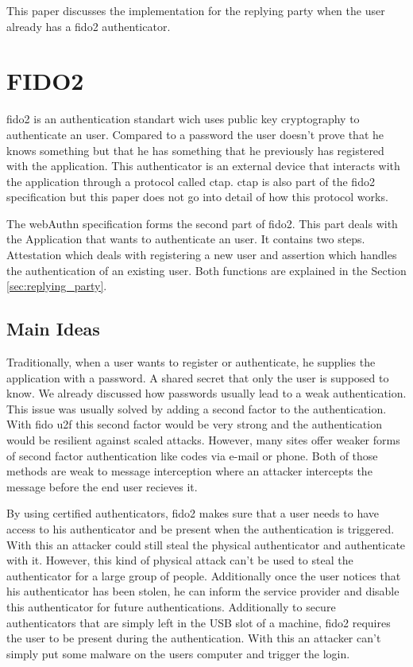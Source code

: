\documentclass[a4paper, 11pt]{scrartcl}
\begin{document}
This paper discusses the implementation for the replying party when the user already has a \gls{fido2} authenticator.

\section{FIDO2}

\gls{fido2} is an authentication standart wich uses public key cryptography to authenticate an user. Compared to a password the user doesn't prove that he knows something but that he has something that he previously has registered with the application. This authenticator is an external device that interacts with the application through a protocol called \gls{ctap}. \gls{ctap} is also part of the \gls{fido2} specification but this paper does not go into detail of how this protocol works. \cite{ctap}

The \gls{webAuthn} specification forms the second part of \gls{fido2}. This part deals with the Application that wants to authenticate an user. It contains two steps. Attestation which deals with registering a new user and assertion which handles the authentication of an existing user. Both functions are explained in the Section \ref{sec:replying_party}.

\subsection{Main Ideas}

Traditionally, when a user wants to register or authenticate, he supplies the application with a password. A shared secret that only the user is supposed to know. We already discussed how passwords usually lead to a weak authentication. This issue was usually solved by adding a second factor to the authentication. With \gls{fido} \gls{u2f} this second factor would be very strong and the authentication would be resilient against scaled attacks. However, many sites offer weaker forms of second factor authentication like codes via e-mail or phone. Both of those methods are weak to message interception where an attacker intercepts the message before the end user recieves it. \cite{smsweak}

By using certified authenticators, \gls{fido2} makes sure that a user needs to have access to his authenticator and be present when the authentication is triggered. With this an attacker could still steal the physical authenticator and authenticate with it. However, this kind of physical attack can't be used to steal the authenticator for a large group of people. Additionally once the user notices that his authenticator has been stolen, he can inform the service provider and disable this authenticator for future authentications. Additionally to secure authenticators that are simply left in the USB slot of a machine, \gls{fido2} requires the user to be present during the authentication. With this an attacker can't simply put some malware on the users computer and trigger the login. 
\end{document}
